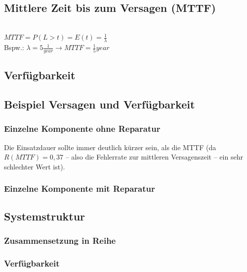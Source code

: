 \subsection{Mittlere Zeit bis zum Versagen (MTTF)}
\\
$MTTF=P(L>t)=E(t)=\frac{1}{\lambda}$\\
Bspw.: $\lambda=5 \frac{1}{year} \to MTTF=\frac{1}{5}year$

\subsection{Verfügbarkeit}

\subsection{Beispiel Versagen und Verfügbarkeit}
\subsubsection{Einzelne Komponente ohne Reparatur}
Die Einsatzdauer sollte immer deutlich kürzer sein, als die MTTF (da $R(MTTF)=0,37$ -- also die Fehlerrate zur mittleren Versagenszeit -- ein sehr schlechter Wert ist).
\subsubsection{Einzelne Komponente mit Reparatur}

\subsection{Systemstruktur}
\subsubsection{Zusammensetzung in Reihe}
\subsubsection*{Verfügbarkeit}
